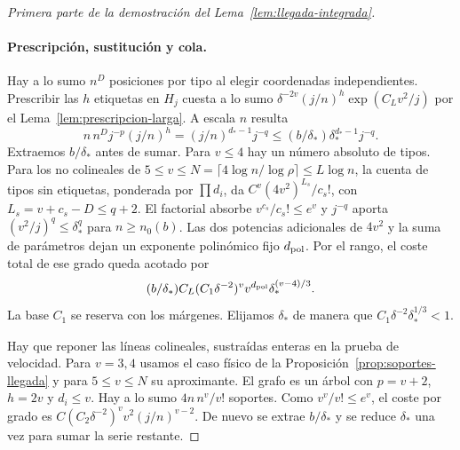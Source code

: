 \begin{proof}[Primera parte de la demostración del Lema~\ref{lem:llegada-integrada}]
\paragraph{Prescripción, sustitución y cola.}
Hay a lo sumo \(n^D\) posiciones por tipo al elegir coordenadas independientes.
Prescribir las \(h\) etiquetas en \(H_j\) cuesta a lo sumo
\(\delta^{-2v}(j/n)^h\exp(C_Lv^2/j)\) por el Lema~\ref{lem:prescripcion-larga}. A escala \(n\) resulta
\[
 n\,n^D j^{-p}(j/n)^h=(j/n)^{d_*-1}j^{-q}
 \le (b/\delta_*)\delta_*^{d_*-1}j^{-q}.
\]
Extraemos \(b/\delta_*\) antes de sumar. Para \(v\le4\) hay un número absoluto de tipos.
Para los no colineales de \(5\le v\le N=\lceil4\log n/\log\rho\rceil\le L\log n\), la
cuenta de tipos sin etiquetas, ponderada por \(\prod d_i\), da
\(C^v(4v^2)^{L_s}/c_s!\), con \(L_s=v+c_s-D\le q+2\).
El factorial absorbe \(v^{c_s}/c_s!\le e^v\) y \(j^{-q}\) aporta
\((v^2/j)^q\le\delta_*^q\) para \(n\ge n_0(b)\). Las dos potencias adicionales de \(4v^2\)
y la suma de parámetros dejan un exponente polinómico fijo \(d_{\rm pol}\).
Por el rango, el coste total de ese grado queda acotado por
\[
 (b/\delta_*) C_L (C_1\delta^{-2})^v v^{d_{\rm pol}}\delta_*^{(v-4)/3}.
\]
La base \(C_1\) se reserva con los márgenes. Elijamos \(\delta_*\) de manera que
\(C_1\delta^{-2}\delta_*^{1/3}<1\).

Hay que reponer las líneas colineales, sustraídas enteras en la prueba de velocidad.
Para \(v=3,4\) usamos el caso físico de la Proposición~\ref{prop:soportes-llegada}
y para \(5\le v\le N\) su aproximante.
El grafo es un árbol con \(p=v+2\), \(h=2v\) y \(d_i\le v\).
Hay a lo sumo \(4n\,n^v/v!\) soportes. Como \(v^v/v!\le e^v\), el coste por grado es
\(C(C_2\delta^{-2})^v v^2(j/n)^{v-2}\). De nuevo se extrae \(b/\delta_*\) y se reduce
\(\delta_*\) una vez para sumar la serie restante.


\end{proof}
